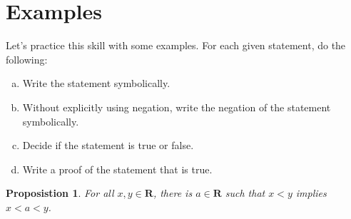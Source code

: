 \documentclass[12pt,fleqn,answers]{exam}
\newcommand{\reals}{\mathbf{R}}
\newtheorem{prop}{Proposistion}
\newenvironment{alphalist}{
  \begin{enumerate}[(a)]
    \addtolength{\itemsep}{-0.50\itemsep}}
  {\end{enumerate}}
\begin{document}
\section{Examples}

Let's practice this skill with some examples. For each given
statement, do the following: 
\begin{alphalist}
\item Write the statement symbolically.
\item Without explicitly using negation, write the negation of 
    the statement symbolically.
\item Decide if the statement is true or false.
\item  Write a proof of the statement that is true.
\end{alphalist}


\begin{prop}
  For all $x,y \in \reals$, there is $a \in \reals$ such that
    $x < y$ implies $x<a<y$.    
\end{prop}
\end{document}
